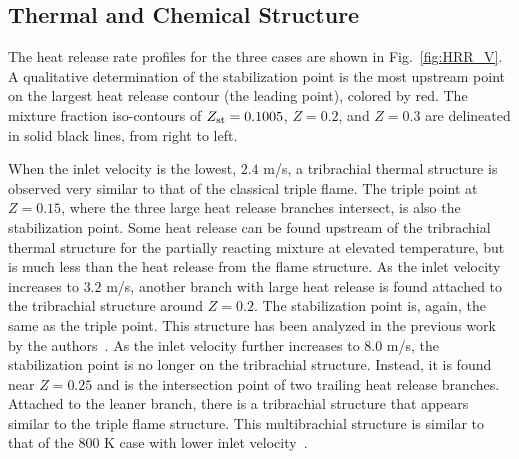 \documentclass[review,3p,times]{elsarticle}
\begin{document}
\begin{table}
  \caption{Computational domain and number of grid points.}
  \label{table:domain_V}
  \centering
  \normalsize
\end{table}

\subsection{Thermal and Chemical Structure}  
The heat release rate profiles for the three cases are shown in Fig.~\ref{fig:HRR_V}.  A qualitative determination of the stabilization point is the most upstream point on the largest heat release contour (the leading point), colored by red.  The mixture fraction iso-contours of $Z_{\rm st} = 0.1005$, $Z = 0.2$, and $Z = 0.3$ are delineated in solid black lines, from right to left.

When the inlet velocity is the lowest, $2.4$ m/s, a tribrachial thermal structure is observed very similar to that of the classical triple flame.  The triple point at $Z = 0.15$, where the three large heat release branches intersect, is also the stabilization point.  Some heat release can be found upstream of the tribrachial thermal structure for the partially reacting mixture at elevated temperature, but is much less than the heat release from the flame structure.  As the inlet velocity increases to $3.2$ m/s, another branch with large heat release is found attached to the tribrachial structure around $Z = 0.2$.  The stabilization point is, again, the same as the triple point.  This structure has been analyzed in the previous work by the authors~\cite{deng15}.  As the inlet velocity further increases to $8.0$ m/s, the stabilization point is no longer on the tribrachial structure.  Instead, it is found near $Z = 0.25$ and is the intersection point of two trailing heat release branches.  Attached to the leaner branch, there is a tribrachial structure that appears similar to the triple flame structure.  This multibrachial structure is similar to that of the $800$ K case with lower inlet velocity~\cite{deng15}.
\end{document}
